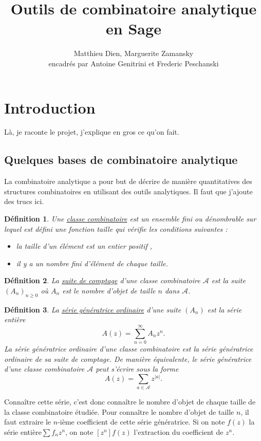 \documentclass[12pt]{article}
\title{Outils de combinatoire analytique en Sage}
\author{Matthieu Dien, Marguerite Zamansky\\
encadrés par Antoine Genitrini et Frederic Peschanski }
\newtheorem*{definition}{Définition}
\begin{document}
     
     \maketitle
     
\section{Introduction}
Là, je raconte le projet, j'explique en gros ce qu'on fait.
\subsection{Quelques bases de combinatoire analytique}
La combinatoire analytique a pour but de décrire de manière quantitatives des structures combinatoires en utilisant des outils analytiques. Il faut que j'ajoute des trucs ici.
\begin{definition}
  Une \underline{classe combinatoire} est un ensemble fini ou dénombrable sur lequel est défini une fonction taille qui vérifie les conditions suivantes : 
  \begin{itemize}
    \item la taille d'un élément est un entier positif ,
    \item il y a un nombre fini d'élément de chaque taille.
  \end{itemize}
\end{definition}

\begin{definition}
La \underline{suite de comptage} d'une classe combinatoire $\mathcal A$ est la suite $(A_n)_{n \geqslant 0}$ où $A_n$ est le nombre d'objet de taille $n$ dans $\mathcal A$.
\end{definition}

\begin{definition}
  La \underline{série génératrice ordinaire} d'une suite $(A_n)$ est la série entière
  $$A(z) = \sum_{n=0}^{\infty} A_n z^n .$$
  La série génératrice ordinaire d'une classe combinatoire est la série génératrice ordinaire de sa suite de comptage. De manière équivalente, le série génératrice d'une classe combinatoire $\mathcal A$ peut s'écrire sous la forme 
  $$A(z) = \sum_{a \in \mathcal A} z ^{|a|} .$$
\end{definition}

Connaître cette série, c'est donc connaître le nombre d'objet de chaque taille de la classe combinatoire étudiée. Pour connaître le nombre d'objet de taille $n$, il faut extraire le $n$-ième coefficient de cette série génératrice. Si on note $f(z)$ la série entière$\sum f_n z^n$, on note $[z^n]f(z)$ l'extraction du coefficient de $z^n$.
\end{document}
